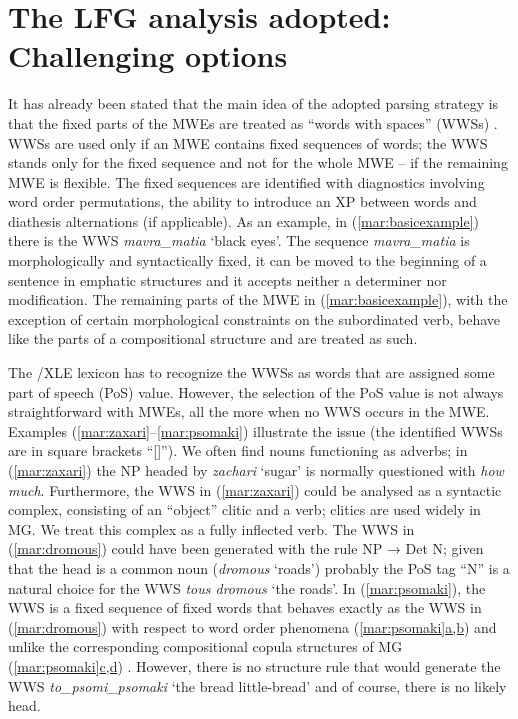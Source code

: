 \documentclass[output=paper]{langsci/langscibook}
\begin{document}
\section{The LFG analysis adopted: Challenging options}
\label{mar:Ssec2}
It has already been stated that the main idea of the adopted parsing strategy is that the fixed parts of the MWEs are treated as “words with spaces” (WWSs) \citep{sag02}.  WWSs are used only if an MWE contains fixed sequences of words; the WWS stands only for the fixed sequence and not for the whole MWE -- if the remaining MWE is flexible. The fixed sequences are identified with diagnostics involving word order permutations, the ability to introduce an XP between words and diathesis alternations (if applicable). As an example, in (\ref{mar:basicexample}) there is the WWS \textit{mavra\_matia} `black eyes'. The sequence \textit{mavra\_matia} is morphologically and syntactically fixed, it can be moved to the beginning of a sentence in emphatic structures and it accepts neither a determiner nor modification. The remaining parts of the MWE in (\ref{mar:basicexample}), with the exception of certain morphological constraints on the subordinated verb, behave like the parts of a compositional structure and are treated as such. 

The /XLE lexicon has to recognize the WWSs as words that are assigned some part of speech (PoS) value. However, the selection of the PoS value is not always straightforward with MWEs, all the more when no WWS occurs in the MWE. Examples (\ref{mar:zaxari}--\ref{mar:psomaki}) illustrate the issue (the identified WWSs are in square brackets ``[]''). We often find nouns functioning as adverbs; in (\ref{mar:zaxari}) the NP headed by \textit{zachari} `sugar' is normally questioned with \textit{how much}. Furthermore, the WWS in (\ref{mar:zaxari}) could be analysed as a syntactic complex, consisting of an  ``object'' clitic and a verb; clitics are used widely in MG.  We treat this complex as a fully inflected verb. The WWS in (\ref{mar:dromous}) could have been generated with the rule NP → Det  N; given that the head is a common noun (\textit{dromous} `roads') probably the PoS tag ``N'' is a natural choice for the WWS \textit{tous dromous} `the roads'. In (\ref{mar:psomaki}), the WWS is a fixed sequence of fixed words that behaves exactly as the WWS in (\ref{mar:dromous})  with respect to word order phenomena (\hyperref[mar:psomaki]{\ref*{mar:psomaki}a,b}) %
and unlike the corresponding compositional copula structures of MG (\hyperref[mar:psomaki]{\ref*{mar:psomaki}c,d})%
. However, there is no  structure rule that would generate the WWS \textit{to\_psomi\_psomaki} `the bread little-bread' and of course, there is no likely head. 
\end{document}
